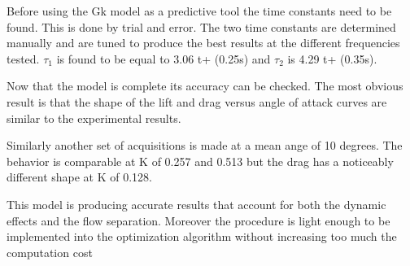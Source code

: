 \par Before using the Gk model as a predictive tool the time constants need to be found.
This is done by trial and error.
The two time constants are determined manually and are tuned to produce the best results at the different frequencies tested.
$\tau_1$ is found to be equal to 3.06 t+ (0.25s) and $\tau_2$ is 4.29 t+ (0.35s).

\par Now that the model is complete its accuracy can be checked.
The most obvious result is that the shape of the lift and drag versus angle of attack curves are similar to the experimental results.
 
\par Similarly another set of acquisitions is made at a mean ange of 10 degrees.
The behavior is comparable at K of 0.257 and 0.513 but the drag has a noticeably different shape at K of 0.128.
%
%

\par This model is producing accurate results that account for both the dynamic effects and the flow separation.
Moreover the procedure is light enough to be implemented into the optimization algorithm without increasing too much the computation cost
